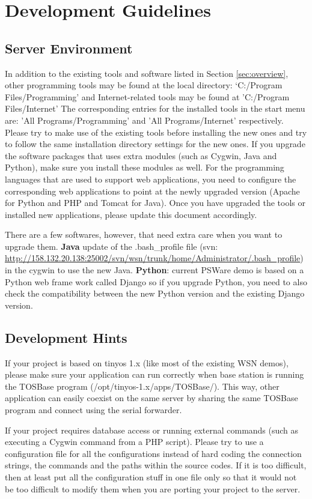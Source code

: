 \section{Development Guidelines}
\subsection{Server Environment}
\label{sec:environment}
In addition to the existing tools and software listed in Section \ref{sec:overview}, other programming tools may be found at the local directory: `C:/Program Files/Programming' and Internet-related tools may be found at 'C:/Program Files/Internet'
The corresponding entries for the installed tools in the start menu are: 'All Programs/Programming' and 'All Programs/Internet' respectively. Please try to make use of the existing tools before installing the new ones and try to follow the same installation directory settings for the new ones. If you upgrade the software packages that uses extra modules (such as Cygwin, Java and Python), make sure you install these modules as well. For the programming languages that are used to support web applications, you need to configure the corresponding web applications to point at the newly upgraded version (Apache for Python and PHP and Tomcat for Java). Once you have upgraded the tools or installed new applications, please update this document accordingly.

There are a few softwares, however, that need extra care when you want to upgrade them. \textbf{Java} update of the .bash\_profile file (svn: \url{http://158.132.20.138:25002/svn/wsn/trunk/home/Administrator/.bash_profile}) in the cygwin to use the new Java. \textbf{Python}: current PSWare demo is based on a Python web frame work called Django so if you upgrade Python, you need to also check the compatibility between the new Python version and the existing Django version.

\subsection{Development Hints}
\label{sec:hints}
If your project is based on tinyos 1.x (like most of the existing WSN demos), please make sure your application can run correctly when base station is running the TOSBase program (/opt/tinyos-1.x/apps/TOSBase/). This way, other application can easily coexist on the same server by sharing the same TOSBase program and connect using the serial forwarder.

If your project requires database access or running external commands (such as executing a Cygwin command from a PHP script). Please try to use a configuration file for all the configurations instead of hard coding the connection strings, the commands and the paths within the source codes. If it is too difficult, then at least put all the configuration stuff in one file only so that it would not be too difficult to modify them when you are porting your project to the server.

